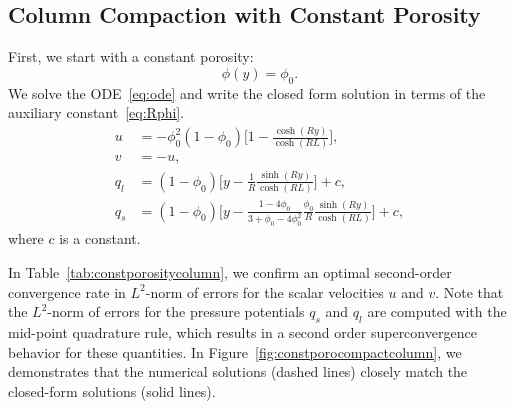 \subsection{Column Compaction with Constant Porosity}
First, we start with a constant porosity:
					 \begin{equation}\label{eq:constporosity}
								\phi(y) = \phi_0.
					 \end{equation}
					We solve the ODE~\eqref{eq:ode} and write the closed form solution in terms of 
					the auxiliary constant~\eqref{eq:Rphi}.
					 \begin{equation}
								\begin{aligned}
										  u &= -\phi_0^2 (1-\phi_0) \bigg[1 - \frac{\cosh{(Ry)}}{\cosh{(RL)}} \bigg], \\
                                v &= -u, \\
										  q_l &= (1-\phi_0) \bigg[y - \frac{1}{R}\frac{\sinh{(Ry)}}{\cosh{(RL)}} \bigg] + c,\\
										  q_s &= (1-\phi_0) \bigg[y - \frac{1-4\phi_0}{3+\phi_0-4\phi_0^2} \frac{\phi_0}{R}\frac{\sinh{(Ry)}}{\cosh{(RL)}} \bigg] + c,
								\end{aligned}
					 \end{equation}
where $c$ is a constant. 

In Table~\ref{tab:constporositycolumn}, we confirm an
optimal second-order convergence rate in $L^2$-norm of errors for
the scalar velocities $u$ and $v$. 
Note that the $L^2$-norm of errors for the pressure potentials $q_s$ and $q_l$ 
are computed with the mid-point quadrature rule,
which results in a second order superconvergence behavior for these quantities.
In Figure~\ref{fig:constporocompactcolumn}, we demonstrates that the numerical solutions (dashed lines) 
closely match the closed-form solutions (solid lines).

